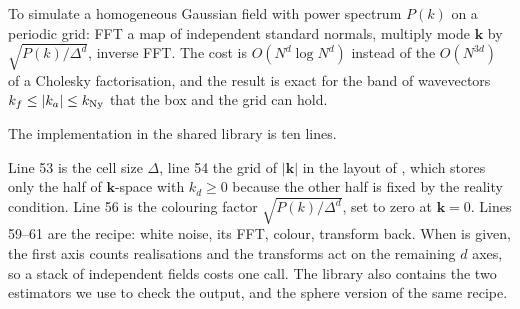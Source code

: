 \begin{keyidea}
To simulate a homogeneous Gaussian field with power spectrum $P(k)$ on a periodic
grid: FFT a map of independent standard normals, multiply mode $\bm k$ by
$\sqrt{P(k)/\Delta^d}$, inverse FFT. The cost is $O(N^d\log N^d)$ instead of the
$O(N^{3d})$ of a Cholesky factorisation, and the result is exact for the
band of wavevectors $k_f\le|k_a|\le k_{\rm Ny}$ that the box and the grid can hold.
\end{keyidea}

The implementation in the shared library is ten lines.


Line 53 is the cell size $\Delta$, line 54 the grid of $|\bm k|$ in the layout of
, which stores only the half of $\bm k$-space with $k_d\ge0$ because
the other half is fixed by the reality condition. Line 56 is the colouring factor
$\sqrt{P(k)/\Delta^d}$, set to zero at $\bm k=0$. Lines 59--61 are the recipe: white
noise, its FFT, colour, transform back. When  is given, the first axis
counts realisations and the transforms act on the remaining $d$ axes, so a stack of
independent fields costs one call. The library also contains the two estimators we
use to check the output, and the sphere version of the same recipe.

